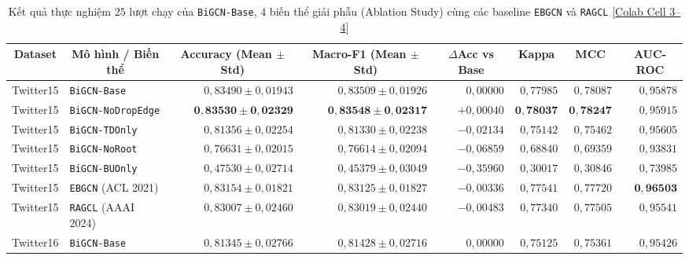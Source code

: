 \documentclass[11pt,a4paper]{extreport}
\newcommand{\ghrepo}{https://github.com/pqui-345/BiGCN-Plus-Rumor-Detection/blob/main}
\newcommand{\coderef}[2]{\textnormal{[\href{\ghrepo/#1}{#2}]}}
\begin{document}
\begin{table}[htbp]
    \centering
    \caption[Kết quả 25 lượt của nhóm BiGCN Ablation, EBGCN và RAGCL]{Kết quả thực nghiệm $25$ lượt chạy của \texttt{BiGCN-Base}, $4$ biến thể giải phẫu (Ablation Study) cùng các baseline \texttt{EBGCN} và \texttt{RAGCL} \coderef{scripts/CT255_RumorDetection_BiGCN_Plus_MultiSeed_5x5_Colab_T4GPU.ipynb}{Colab Cell 3--4}}
    \label{tab:ablation-results}
    \footnotesize
    \setlength{\tabcolsep}{4pt}
    \begin{tabular}{@{}llrrrrrr@{}}
        \toprule
        \multicolumn{1}{c}{\textbf{Dataset}} & \multicolumn{1}{c}{\textbf{Mô hình / Biến thể}} & \multicolumn{1}{c}{\textbf{Accuracy (Mean $\pm$ Std)}} & \multicolumn{1}{c}{\textbf{Macro-F1 (Mean $\pm$ Std)}} & \multicolumn{1}{c}{\textbf{$\Delta$Acc vs Base}} & \multicolumn{1}{c}{\textbf{Kappa}} & \multicolumn{1}{c}{\textbf{MCC}} & \multicolumn{1}{c}{\textbf{AUC-ROC}} \\
        \midrule
        Twitter15 & \texttt{BiGCN-Base}       & $0{,}83490 \pm 0{,}01943$ & $0{,}83509 \pm 0{,}01926$ & $0{,}00000$ & $0{,}77985$ & $0{,}78087$ & $0{,}95878$ \\
        Twitter15 & \texttt{BiGCN-NoDropEdge} & $\mathbf{0{,}83530 \pm 0{,}02329}$ & $\mathbf{0{,}83548 \pm 0{,}02317}$ & $+0{,}00040$ & $\mathbf{0{,}78037}$ & $\mathbf{0{,}78247}$ & $0{,}95915$ \\
        Twitter15 & \texttt{BiGCN-TDOnly}     & $0{,}81356 \pm 0{,}02254$ & $0{,}81330 \pm 0{,}02238$ & $-0{,}02134$ & $0{,}75142$ & $0{,}75462$ & $0{,}95605$ \\
        Twitter15 & \texttt{BiGCN-NoRoot}     & $0{,}76631 \pm 0{,}02015$ & $0{,}76614 \pm 0{,}02094$ & $-0{,}06859$ & $0{,}68840$ & $0{,}69359$ & $0{,}93831$ \\
        Twitter15 & \texttt{BiGCN-BUOnly}     & $0{,}47530 \pm 0{,}02714$ & $0{,}45379 \pm 0{,}03049$ & $-0{,}35960$ & $0{,}30017$ & $0{,}30846$ & $0{,}73985$ \\
        Twitter15 & \texttt{EBGCN} (ACL 2021) & $0{,}83154 \pm 0{,}01821$ & $0{,}83125 \pm 0{,}01827$ & $-0{,}00336$ & $0{,}77541$ & $0{,}77720$ & $\mathbf{0{,}96503}$ \\
        Twitter15 & \texttt{RAGCL} (AAAI 2024)& $0{,}83007 \pm 0{,}02460$ & $0{,}83019 \pm 0{,}02440$ & $-0{,}00483$ & $0{,}77340$ & $0{,}77505$ & $0{,}95541$ \\
        \addlinespace[4pt]
        Twitter16 & \texttt{BiGCN-Base}       & $0{,}81345 \pm 0{,}02766$ & $0{,}81428 \pm 0{,}02716$ & $0{,}00000$ & $0{,}75125$ & $0{,}75361$ & $0{,}95426$ \\

\end{tabular}
\end{table}
\end{document}
